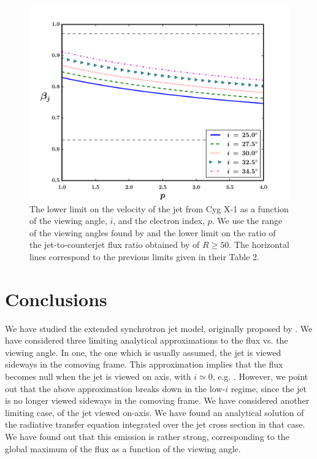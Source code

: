 \begin{figure}
\begin{center}
\includegraphics[scale=0.5]{beta_vs_p_CygX-1_Ziokowski.pdf}
\caption[The lower limit on the velocity of the jet from Cygnus X-1]{The lower limit on the velocity of the jet from Cyg X-1 as a function of the viewing angle, $i$, and the electron index, $p$. We use the range of the viewing angles found by  and the lower limit on the ratio of the jet-to-counterjet flux ratio obtained by  of $ R \geq 50 $. The horizontal lines correspond to the previous limits given in their Table 2.}
\label{fig:beta_p}
\end{center}
\end{figure}


\section{Conclusions}
\label{sec:conclusions--jet_model}
We have studied the extended synchrotron jet model, originally proposed by . We have considered three limiting analytical approximations to the flux vs. the viewing angle. In one, the one which is usually assumed, the jet is viewed sideways in the comoving frame. This approximation implies that the flux becomes null when the jet is viewed on axis, with $i \simeq 0$, e.g. . However, we point out that the above approximation breaks down in the low-$i$ regime, since the jet is no longer viewed sideways in the comoving frame. We have considered another limiting case, of the jet viewed on-axis. We have found an analytical solution of the radiative transfer equation integrated over the jet cross section in that case. We have found out that this emission is rather strong, corresponding to the global maximum of the flux as a function of the viewing angle. 

